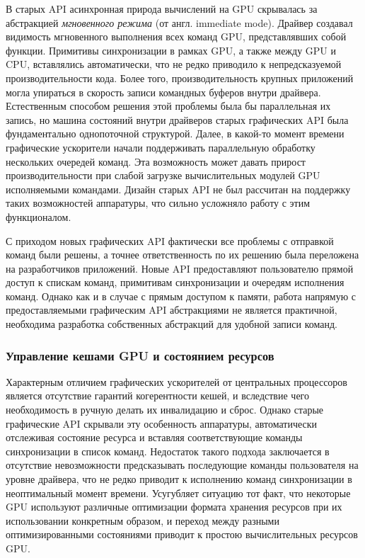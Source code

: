 В старых API асинхронная природа вычислений на GPU скрывалась за абстракцией \textit{мгновенного режима} (от англ. immediate mode).
Драйвер создавал видимость мгновенного выполнения всех команд GPU, представлявших собой функции.
Примитивы синхронизации в рамках GPU, а также между GPU и CPU, вставлялись автоматически, что не редко приводило к непредсказуемой производительности кода.
Более того, производительность крупных приложений могла упираться в скорость записи командных буферов внутри драйвера.
Естественным способом решения этой проблемы была бы параллельная их запись, но машина состояний внутри драйверов старых графических API была фундаментально однопоточной структурой.
Далее, в какой-то момент времени графические ускорители начали поддерживать параллельную обработку нескольких очередей команд.
Эта возможность может давать прирост производительности при слабой загрузке вычислительных модулей GPU исполняемыми командами.
Дизайн старых API не был рассчитан на поддержку таких возможностей аппаратуры, что сильно усложняло работу с этим функционалом.

С приходом новых графических API фактически все проблемы с отправкой команд были решены, а точнее ответственность по их решению была переложена на разработчиков приложений.
Новые API предоставляют пользователю прямой доступ к спискам команд, примитивам синхронизации и очередям исполнения команд.
Однако как и в случае с прямым доступом к памяти, работа напрямую с предоставляемыми графическим API абстракциями не является практичной, необходима разработка собственных абстракций для удобной записи команд.

\subsubsection{Управление кешами GPU и состоянием ресурсов}
Характерным отличием графических ускорителей от центральных процессоров является отсутствие гарантий когерентности кешей, и вследствие чего необходимость в ручную делать их инвалидацию и сброс.
Однако старые графические API скрывали эту особенность аппаратуры, автоматически отслеживая состояние ресурса и вставляя соответствующие команды синхронизации в список команд.
Недостаток такого подхода заключается в отсутствие невозможности предсказывать последующие команды пользователя на уровне драйвера, что не редко приводит к исполнению команд синхронизации в неоптимальный момент времени.
Усугубляет ситуацию тот факт, что некоторые GPU используют различные оптимизации формата хранения ресурсов при их использовании конкретным образом, и переход между разными оптимизированными состояниями приводит к простою вычислительных ресурсов GPU.

